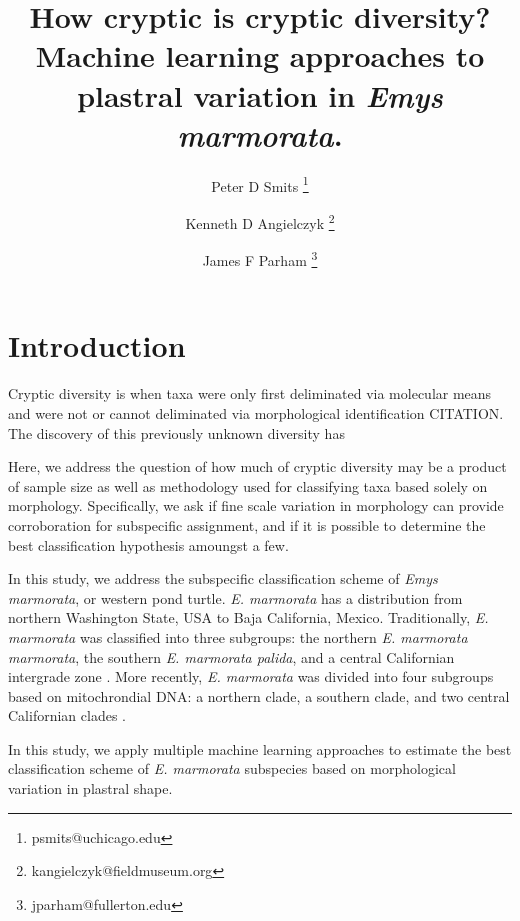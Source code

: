 \documentclass[12pt]{article}\usepackage{graphicx, color}
\title{How cryptic is cryptic diversity? Machine learning approaches to plastral variation in \textit{Emys marmorata}.}
\author[1]{Peter D Smits \thanks{psmits@uchicago.edu}}
\author[2]{Kenneth D Angielczyk \thanks{kangielczyk@fieldmuseum.org}}
\author[3]{James F Parham \thanks{jparham@fullerton.edu}}
\affil[1]{Committee on Evolution Biology, University of Chicago}
\affil[2]{Department of Geology, Field Museum of Natural History}
\affil[3]{Department of Geological Sciences, California State University -- Fullerton}
\begin{document}
\maketitle

\linenumbers
\modulolinenumbers[2]

\begin{abstract}

\end{abstract}

\section{Introduction}

Cryptic diversity is when taxa were only first deliminated via molecular means and were not or cannot deliminated via morphological identification CITATION. The discovery of this previously unknown diversity has

Here, we address the question of how much of cryptic diversity may be a product of sample size as well as methodology used for classifying taxa based solely on morphology. Specifically, we ask if fine scale variation in morphology can provide corroboration for subspecific assignment, and if it is possible to determine the best classification hypothesis amoungst a few.

In this study, we address the subspecific classification scheme of \textit{Emys marmorata}, or western pond turtle. \textit{E. marmorata} has a distribution from northern Washington State, USA to Baja California, Mexico.
Traditionally, \textit{E. marmorata} was classified into three subgroups: the northern \textit{E. marmorata marmorata}, the southern \textit{E. marmorata palida}, and a central Californian intergrade zone \citep{Seeliger1945}. More recently, \textit{E. marmorata} was divided into four subgroups based on mitochrondial DNA: a northern clade, a southern clade, and two central Californian clades \citep{Spinks2005,Spinks2009}.

In this study, we apply multiple machine learning approaches to estimate the best classification scheme of \textit{E. marmorata} subspecies based on morphological variation in plastral shape. 
\end{document}
